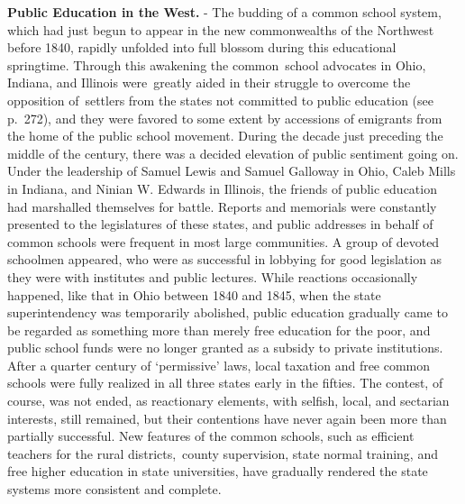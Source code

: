\documentclass[
]{book}
\begin{document}
\textbf{Public Education in the West.} - The budding of a common school system, which had just begun to appear in the new commonwealths of the Northwest before 1840, rapidly unfolded into full blossom during this educational springtime. Through this awakening the common~school advocates in Ohio, Indiana, and Illinois were~greatly aided in their struggle to overcome the opposition of~settlers from the states not committed to public education (see p.~272), and they were favored to some extent by accessions of emigrants from the home of the public school movement. During the decade just preceding the middle of the century, there was a decided elevation of public sentiment going on. Under the leadership of Samuel Lewis and Samuel Galloway in Ohio, Caleb Mills in Indiana, and Ninian W. Edwards in Illinois, the friends of public education had marshalled themselves for battle. Reports and memorials were constantly presented to the legislatures of these states, and public addresses in behalf of common schools were frequent in most large communities. A group of devoted schoolmen appeared, who were as successful in lobbying for good legislation as they were with institutes and public lectures. While reactions occasionally happened, like that in Ohio between 1840 and 1845, when the state superintendency was temporarily abolished, public education gradually came to be regarded as something more than merely free education for the poor, and public school funds were no longer granted as a subsidy to private institutions. After a quarter century of `permissive' laws, local taxation and free common schools were fully realized in all three states early in the fifties. The contest, of course, was not ended, as reactionary elements, with selfish, local, and sectarian interests, still remained, but their contentions have never again been more than partially successful. New features of the common schools, such as efficient teachers for the rural districts,~county supervision, state normal training, and free higher education in state universities, have gradually rendered the state systems more consistent and complete.
\end{document}
